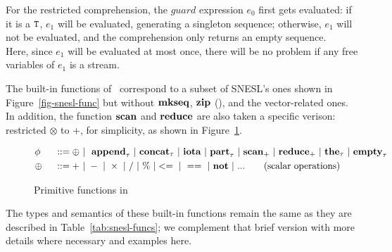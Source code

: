 For the restricted comprehension, the $guard$ expression $e_0$ first gets evaluated: if it is a $\mathtt{T}$, $e_1$ will be evaluated, generating a singleton sequence; otherwise, $e_1$ will not be evaluated, and the comprehension only returns an empty sequence. \\
Here, since $e_1$ will be evaluated at most once, there will be no problem if any free variables of $e_1$ is a stream.

The built-in functions of \mysnesl \ correspond to a subset of SNESL's ones shown in Figure~\ref{fig-snesl-func} but without $\mathbf{mkseq}$, $\mathbf{zip}$ (), and the vector-related ones. 
In addition, the function $\mathbf{scan}$ and $\mathbf{reduce}$ are also
taken a specific verison: restricted $\otimes$ to +, for simplicity, as shown in Figure~\ref{fig-mysnesl-func}. 


\begin{figure}[H]\large
	\begin{alignat*}{2} 
	&\phi && ::= \oplus \ | \  \ \mathbf{append}_{\tau} \ | \ \mathbf{concat}_{\tau}  \ | \ \mathbf{iota}  \ | \ \mathbf{part}_{\tau}  \ | \ \mathbf{scan}_+ \ | \ \mathbf{reduce}_{+} \ | \ \mathbf{the}_{\tau}  \ | \ \mathbf{empty}_{\tau} \\	
	& \oplus  \ && :: = + \ | \ - \ | \ \times \ |  \  / \ | \ \% \ | <= \ | \ == \ | \  \mathbf{not} \ | \ ... \tag{scalar operations} 
	\end{alignat*}
	\caption{Primitive functions in \mysnesl \label{fig-mysnesl-func}}
\end{figure}

The types and semantics of these built-in functions remain the same as they are described in Table~\ref{tab:snesl-funcs}; we complement that brief version with more details where necessary and examples here.

